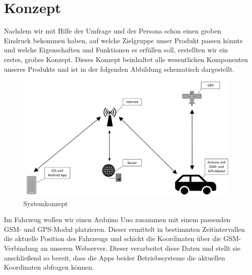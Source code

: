 \section{Konzept} 
Nachdem wir mit Hilfe der Umfrage und der Persona schon einen groben Eindruck bekommen haben, auf welche Zielgruppe unser Produkt passen könnte und welche Eigenschaften und Funktionen es erfüllen soll, erstellten wir ein erstes, grobes Konzept. Dieses Konzept beinhaltet alle wesentlichen Komponenten unseres Produkts und ist in der folgenden Abbildung schematisch dargestellt.
\begin{figure} [H]
	\begin{center}
		\includegraphics[width=1\textwidth]{Bilder/Konzept_Konzept.png}
		\caption{Systemkonzept}
		\label{konzept}
	\end{center}
\end{figure}
Im Fahrzeug wollen wir einen Arduino Uno zusammen mit einem passenden GSM- und GPS-Modul platzieren. Dieser ermittelt in bestimmten Zeitintervallen die aktuelle Position des Fahrzeugs und schickt die Koordinaten über die GSM-Verbindung an unseren Webserver. Dieser verarbeitet diese Daten und stellt sie anschließend so bereit, dass die Apps beider Betriebssysteme die aktuellen Koordinaten abfragen können.
